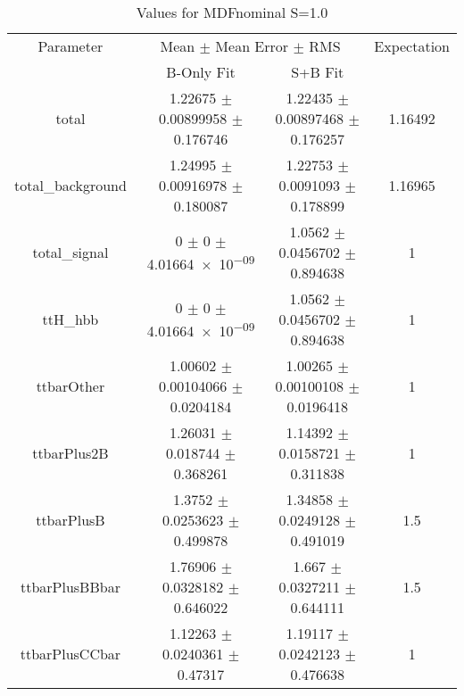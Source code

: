 \begin{table}
\centering
\caption{Values for MDFnominal S=1.0}
\begin{tabular}{cccc}
\toprule
Parameter & \multicolumn{2}{c}{Mean $\pm$ Mean Error $\pm$ RMS} & Expectation\\
 & B-Only Fit & S+B Fit & \\
\midrule
total & \num{1.22675} $\pm$ \num{0.00899958} $\pm$ \num{0.176746} & \num{1.22435} $\pm$ \num{0.00897468} $\pm$ \num{0.176257} & \num{1.16492}\\
total\_background & \num{1.24995} $\pm$ \num{0.00916978} $\pm$ \num{0.180087} & \num{1.22753} $\pm$ \num{0.0091093} $\pm$ \num{0.178899} & \num{1.16965}\\
total\_signal & \num{0} $\pm$ \num{0} $\pm$ \num{4.01664e-09} & \num{1.0562} $\pm$ \num{0.0456702} $\pm$ \num{0.894638} & \num{1}\\
ttH\_hbb & \num{0} $\pm$ \num{0} $\pm$ \num{4.01664e-09} & \num{1.0562} $\pm$ \num{0.0456702} $\pm$ \num{0.894638} & \num{1}\\
ttbarOther & \num{1.00602} $\pm$ \num{0.00104066} $\pm$ \num{0.0204184} & \num{1.00265} $\pm$ \num{0.00100108} $\pm$ \num{0.0196418} & \num{1}\\
ttbarPlus2B & \num{1.26031} $\pm$ \num{0.018744} $\pm$ \num{0.368261} & \num{1.14392} $\pm$ \num{0.0158721} $\pm$ \num{0.311838} & \num{1}\\
ttbarPlusB & \num{1.3752} $\pm$ \num{0.0253623} $\pm$ \num{0.499878} & \num{1.34858} $\pm$ \num{0.0249128} $\pm$ \num{0.491019} & \num{1.5}\\
ttbarPlusBBbar & \num{1.76906} $\pm$ \num{0.0328182} $\pm$ \num{0.646022} & \num{1.667} $\pm$ \num{0.0327211} $\pm$ \num{0.644111} & \num{1.5}\\
ttbarPlusCCbar & \num{1.12263} $\pm$ \num{0.0240361} $\pm$ \num{0.47317} & \num{1.19117} $\pm$ \num{0.0242123} $\pm$ \num{0.476638} & \num{1}\\
\bottomrule
\end{tabular}
\end{table}
